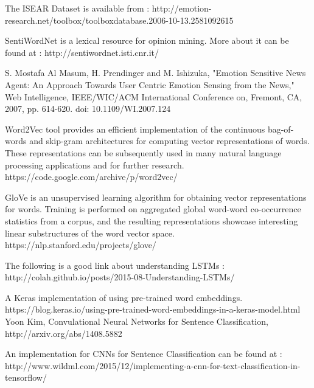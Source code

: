 \documentclass[conference]{IEEEtran}
\numberwithin{equation}{section}
\numberwithin{figure}{section}
\numberwithin{table}{section}
\begin{document}
%
%
%
\begin{thebibliography}{1}
The ISEAR Dataset is available from : http://emotion-research.net/toolbox/toolboxdatabase.2006-10-13.2581092615

SentiWordNet is a lexical resource for opinion mining. More about it can be found at : http://sentiwordnet.isti.cnr.it/

S. Mostafa Al Masum, H. Prendinger and M. Ishizuka, "Emotion Sensitive News Agent: An Approach Towards User Centric Emotion Sensing from the News," Web Intelligence, IEEE/WIC/ACM International Conference on, Fremont, CA, 2007, pp. 614-620.
doi: 10.1109/WI.2007.124

Word2Vec tool provides an efficient implementation of the continuous bag-of-words and skip-gram architectures for computing vector representations of words. These representations can be subsequently used in many natural language processing applications and for further research. https://code.google.com/archive/p/word2vec/

GloVe is an unsupervised learning algorithm for obtaining vector representations for words. Training is performed on aggregated global word-word co-occurrence statistics from a corpus, and the resulting representations showcase interesting linear substructures of the word vector space. https://nlp.stanford.edu/projects/glove/

The following is a good link about understanding LSTMs : http://colah.github.io/posts/2015-08-Understanding-LSTMs/

A Keras implementation of using pre-trained word embeddings.
https://blog.keras.io/using-pre-trained-word-embeddings-in-a-keras-model.html
Yoon Kim, Convulational Neural Networks for Sentence Classification, http://arxiv.org/abs/1408.5882

An implementation for CNNs for Sentence Classification can be found at : http://www.wildml.com/2015/12/implementing-a-cnn-for-text-classification-in-tensorflow/

\end{thebibliography}
\end{document}
